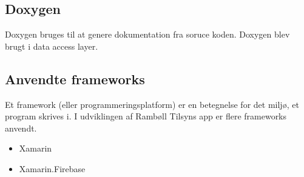 \subsection*{Doxygen}
Doxygen \cite{DoxygenInfo} bruges til at genere dokumentation fra soruce koden. Doxygen blev brugt i data access layer.   

\clearpage

\subsection*{Anvendte frameworks} 
Et framework (eller programmeringsplatform) er en betegnelse for det miljø, 
et program skrives i. I udviklingen af Rambøll Tilsyns app
er flere frameworks anvendt.
\begin{itemize}[-]
	\item Xamarin \cite{XamarinDoc}
	\item Xamarin.Firebase \cite{FirebaseDoc}
	
	
\end{itemize}
